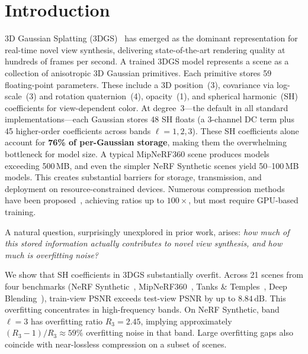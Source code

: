 \documentclass[sigconf,review]{acmart}
\newcommand{\dB}{\,\text{dB}}
\newcommand{\R}[1]{R_{#1}}
\begin{document}
\section{Introduction}
\label{sec:intro}

3D Gaussian Splatting (3DGS)~\cite{kerbl2023gaussians} has emerged as the dominant representation for real-time novel view synthesis, delivering state-of-the-art rendering quality at hundreds of frames per second.
A trained 3DGS model represents a scene as a collection of anisotropic 3D Gaussian primitives.
Each primitive stores 59 floating-point parameters.
These include a 3D position~(3), covariance via log-scale~(3) and rotation quaternion~(4), opacity~(1), and spherical harmonic~(SH) coefficients for view-dependent color.
At degree~3---the default in all standard implementations---each Gaussian stores 48 SH floats (a 3-channel DC term plus 45 higher-order coefficients across bands $\ell{=}1,2,3$).
These SH coefficients alone account for \textbf{76\% of per-Gaussian storage}, making them the overwhelming bottleneck for model size.
A typical MipNeRF360 scene produces models exceeding 500\,MB, and even the simpler NeRF Synthetic scenes yield 50--100\,MB models.
This creates substantial barriers for storage, transmission, and deployment on resource-constrained devices.
Numerous compression methods have been proposed~\cite{chen2025hacpp, chen2024fcgs, flexgaussian2025, lightgaussian2024, compact3d2024}, achieving ratios up to $100{\times}$, but most require GPU-based training.

A natural question, surprisingly unexplored in prior work, arises: \emph{how much of this stored information actually contributes to novel view synthesis, and how much is overfitting noise?}

We show that SH coefficients in 3DGS substantially overfit.
Across 21 scenes from four benchmarks (NeRF Synthetic~\cite{mildenhall2020nerf}, Mip\-NeRF360~\cite{barron2022mipnerf360}, Tanks \& Temples~\cite{knapitsch2017tanks}, Deep Blending~\cite{hedman2018deep}), train-view PSNR exceeds test-view PSNR by up to $8.84\dB$.
This overfitting concentrates in high-frequency bands.
On NeRF Synthetic, band~$\ell{=}3$ has overfitting ratio $\R{3}{=}2.45$, implying approximately $(\R{3}{-}1)/\R{3} \approx 59\%$ overfitting noise in that band.
Large overfitting gaps also coincide with near-lossless compression on a subset of scenes.
\end{document}
